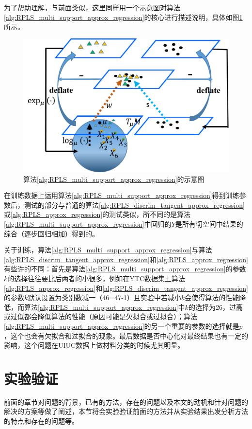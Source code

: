 为了帮助理解，与前面类似，这里同样用一个示意图对算法\ref{alg:RPLS_multi_support_approx_regression}的核心进行描述说明，具体如图\ref{fig:multi_discrim_tangent_PLS}所示。
\begin{figure}[bht]
	\centering
	\includegraphics[width=0.7\linewidth]{source/multi_discrim_tangent_PLS.png}
	\caption{算法\ref{alg:RPLS_multi_support_approx_regression}的示意图}
	\label{fig:multi_discrim_tangent_PLS}
\end{figure}

在训练数据上运用算法\ref{alg:RPLS_multi_support_approx_regression}得到训练参数后，测试的部分与普通的算法\ref{alg:RPLS_discrim_tangent_approx_regression}或\ref{alg:RPLS_approx_regression}的测试类似，所不同的是算法\ref{alg:RPLS_multi_support_approx_regression}中回归的$Y$是所有切空间中结果的综合（逐步回归相加）得到的。

关于训练，算法\ref{alg:RPLS_multi_support_approx_regression}与算法\ref{alg:RPLS_discrim_tangent_approx_regression}和\ref{alg:RPLS_approx_regression}有些许的不同：首先是算法\ref{alg:RPLS_multi_support_approx_regression}的参数$k$的选择往往要比后两者的小很多，例如在YTC\cite{Database_YTC}数据集上算法\ref{alg:RPLS_approx_regression}和\ref{alg:RPLS_discrim_tangent_approx_regression}的参数$k$默认设置为类别数减一（46=47-1）且实验中若减小$k$会使得算法的性能降低，而算法\ref{alg:RPLS_multi_support_approx_regression}中$k$的选择为26，过高或过低都会降低算法的性能（原因可能是欠拟合或过拟合）；算法\ref{alg:RPLS_multi_support_approx_regression}的另一个重要的参数的选择就是$p$，这个也会有欠拟合和过拟合的现象。最后数据是否中心化对最终结果也有一定的影响，这个问题在UIUC\cite{Database_UIUC}数据上做材料分类的时候尤其明显。
\section{实验验证}
\label{sec:RPLS_exp}
前面的章节对问题的背景，已有的方法，存在的问题以及本文的动机和针对问题的解决的方案等做了阐述，本节将会实验验证前面的方法并从实验结果出发分析方法的特点和存在的问题等。

